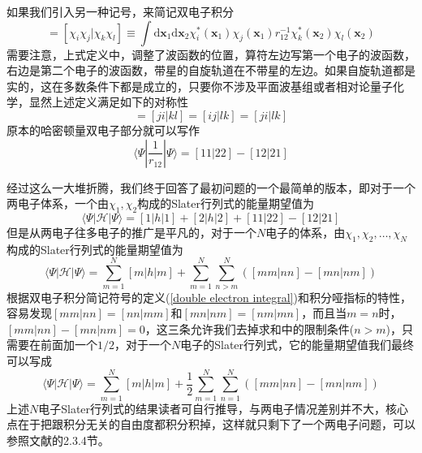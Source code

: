 \documentclass[12pt,a4paper,openany,twoside]{book}
\numberwithin{equation}{section}
\begin{document}
          如果我们引入另一种记号，来简记双电子积分
          \begin{equation}
            [i j | k l] =\left[\chi_{i} \chi_{j} | \chi_{k} \chi_{l}\right]\equiv\int \mathrm{d} \mathbf{x}_{1} \mathrm{d} \mathbf{x}_{2} \chi_{i}^{*}\left(\mathbf{x}_{1}\right) \chi_{j}\left(\mathbf{x}_{1}\right) r_{12}^{-1} \chi_{{k}}^{*}\left(\mathbf{x}_{2}\right) \chi_{l}\left(\mathbf{x}_{2}\right)
            \label{double electron integral}
          \end{equation}
          需要注意，上式定义中，调整了波函数的位置，算符左边写第一个电子的波函数，右边是第二个电子的波函数，带星的自旋轨道在不带星的左边。如果自旋轨道都是实的，这在多数条件下都是成立的，只要你不涉及平面波基组或者相对论量子化学，显然上述定义满足如下的对称性
          \begin{equation}
            [i j | k l]=[j i | k l]=[i j | l k]=[j i | l k]
          \end{equation}
          原本的哈密顿量双电子部分就可以写作
          \begin{equation}
            \langle\Psi|\frac{1}{r_{12}}| \Psi \rangle = [11|22] - [12|21]
          \end{equation}
          
          经过这么一大堆折腾，我们终于回答了最初问题的一个最简单的版本，即对于一个两电子体系，一个由$\chi_1, \chi_2$构成的Slater行列式的能量期望值为
          \begin{equation}
            \langle \Psi|\mathscr{H}|\Psi\rangle = [1|h|1] + [2|h|2] + [11|22] - [12|21]
          \end{equation}
          但是从两电子往多电子的推广是平凡的，对于一个$N$电子的体系，由$\chi_1, \chi_2,\dots,\chi_N$构成的Slater行列式的能量期望值为
          \begin{equation}
            \langle \Psi|\mathscr{H}|\Psi\rangle =\sum_{m=1}^N [m|h|m] + \sum_{m=1}^N\sum_{n>m}^N \left([mm|nn] - [mn|nm]\right)
          \end{equation}
          根据双电子积分简记符号的定义(\ref{double electron integral})和积分哑指标的特性，容易发现$[mm|nn] = [nn|mm]$和$[mn|nm]=[nm|mn]$，而且当$m=n$时，$[mm|nn] - [mn|nm] = 0$，这三条允许我们去掉求和中的限制条件($n>m$)，只需要在前面加一个$1/2$，对于一个$N$电子的Slater行列式，它的能量期望值我们最终可以写成
          \begin{equation}
            \langle \Psi|\mathscr{H}|\Psi\rangle =\sum_{m=1}^N [m|h|m] + \frac{1}{2}\sum_{m=1}^N\sum_{n=1}^N \left([mm|nn] - [mn|nm]\right)
          \end{equation}
          上述$N$电子Slater行列式的结果读者可自行推导，与两电子情况差别并不大，核心点在于把跟积分无关的自由度都积分积掉，这样就只剩下了一个两电子问题，可以参照文献\cite{Szabo1989Modern}的2.3.4节。
\end{document}

